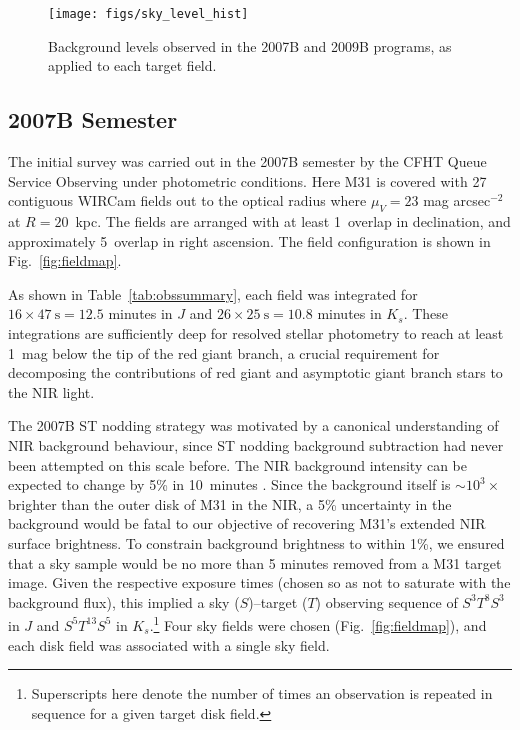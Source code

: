 \documentclass[iop]{emulateapj}
\newcommand{\Fig}[1]{Fig.~\ref{fig:#1}}  %
\begin{document}
\begin{figure}[t]
\centering
\texttt{[image: figs/sky\_level\_hist]}
\caption{Background levels observed in the 2007B and 2009B programs, as applied to each target field.}
\label{fig:net_sky_level}
\end{figure}

\subsection{2007B Semester}
\label{sec:obs7}

The initial survey was carried out in the 2007B semester by the CFHT Queue Service Observing under photometric conditions.
Here M31 is covered with 27 contiguous WIRCam fields out to the optical radius where $\mu_V=23$ mag arcsec$^{-2}$ at $R=20$~kpc.
The fields are arranged with at least 1\arcmin\ overlap in declination, and approximately 5\arcmin\ overlap in right ascension.
The field configuration is shown in \Fig{fieldmap}.

As shown in Table~\ref{tab:obssummary}, each field was integrated for $16\times 47~\mathrm{s} = 12.5$ minutes in $J$ and $26\times 25~\mathrm{s} = 10.8$ minutes in $K_s$.
These integrations are sufficiently deep for resolved stellar photometry to reach at least 1~mag below the tip of the red giant branch, a crucial requirement for decomposing the contributions of red giant and asymptotic giant branch stars to the NIR light.

The 2007B ST nodding strategy was motivated by a canonical understanding of NIR background behaviour, since ST nodding background subtraction had never been attempted on this scale before.
The NIR background intensity can be expected to change by 5\% in 10~minutes \citep{Adams:1996,Vaduvescu:2004}.
Since the background itself is $\sim10^3\times$ brighter than the outer disk of M31 in the NIR, a 5\% uncertainty in the background would be fatal to our objective of recovering M31's extended NIR surface brightness.
To constrain background brightness to within 1\%, we ensured that a sky sample would be no more than 5 minutes removed from a M31 target image.
Given the respective exposure times (chosen so as not to saturate with the background flux), this implied a sky ($S$)--target ($T$) observing sequence of $S^3T^8S^3$ in $J$ and $S^5T^{13}S^5$ in $K_s$.\footnote{Superscripts here denote the number of times an observation is repeated in sequence for a given target disk field.}
Four sky fields were chosen (\Fig{fieldmap}), and each disk field was associated with a single sky field.
\end{document}
